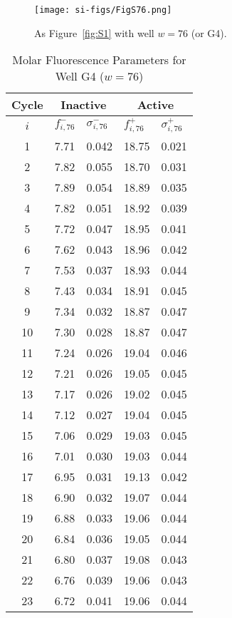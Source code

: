                 \begin{figure}
                    \centering
                    \texttt{[image: si-figs/FigS76.png]}
                    \caption{
                        As Figure~\ref{fig:S1} with well $w=76$ (or G4).
                    }
                \end{figure}
                \clearpage
    \begin{table}
        \caption{Molar Fluorescence Parameters for Well G4 ($w=76$)}
        \centering
        \begin{tabular}{c|ll|ll}
            Cycle & \multicolumn{2}{c|}{Inactive} & \multicolumn{2}{c}{Active} \\
            \hline
            $i$ & $f_{i,76}^{-}$ & $\sigma_{i,76}^{-}$ &  $f_{i,76}^{+}$ & $\sigma_{i,76}^{+}$ \\
            \hline
    1 & 7.71 & 0.042 & 18.75 & 0.021 \\
2 & 7.82 & 0.055 & 18.70 & 0.031 \\
3 & 7.89 & 0.054 & 18.89 & 0.035 \\
4 & 7.82 & 0.051 & 18.92 & 0.039 \\
5 & 7.72 & 0.047 & 18.95 & 0.041 \\
6 & 7.62 & 0.043 & 18.96 & 0.042 \\
7 & 7.53 & 0.037 & 18.93 & 0.044 \\
8 & 7.43 & 0.034 & 18.91 & 0.045 \\
9 & 7.34 & 0.032 & 18.87 & 0.047 \\
10 & 7.30 & 0.028 & 18.87 & 0.047 \\
11 & 7.24 & 0.026 & 19.04 & 0.046 \\
12 & 7.21 & 0.026 & 19.05 & 0.045 \\
13 & 7.17 & 0.026 & 19.02 & 0.045 \\
14 & 7.12 & 0.027 & 19.04 & 0.045 \\
15 & 7.06 & 0.029 & 19.03 & 0.045 \\
16 & 7.01 & 0.030 & 19.03 & 0.044 \\
17 & 6.95 & 0.031 & 19.13 & 0.042 \\
18 & 6.90 & 0.032 & 19.07 & 0.044 \\
19 & 6.88 & 0.033 & 19.06 & 0.044 \\
20 & 6.84 & 0.036 & 19.05 & 0.044 \\
21 & 6.80 & 0.037 & 19.08 & 0.043 \\
22 & 6.76 & 0.039 & 19.06 & 0.043 \\
23 & 6.72 & 0.041 & 19.06 & 0.044 \\

\end{tabular}
\end{table}
